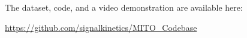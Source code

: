 The dataset, code, and a video demonstration are available here: 

\href{https://github.com/signalkinetics/MITO\_Codebase}{https://github.com/signalkinetics/MITO\_Codebase}


